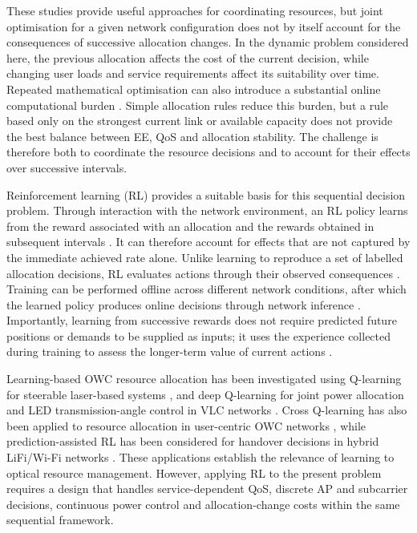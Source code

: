 \documentclass[journal]{IEEEtran}
\begin{document}
These studies provide useful approaches for coordinating resources, but joint optimisation for a given network configuration does not by itself account for the consequences of successive allocation changes. In the dynamic problem considered here, the previous allocation affects the cost of the current decision, while changing user loads and service requirements affect its suitability over time. Repeated mathematical optimisation can also introduce a substantial online computational burden \cite{Jiang2018,Ncube2025Predictive}. Simple allocation rules reduce this burden, but a rule based only on the strongest current link or available capacity does not provide the best balance between EE, QoS and allocation stability. The challenge is therefore both to coordinate the resource decisions and to account for their effects over successive intervals.

Reinforcement learning (RL) provides a suitable basis for this sequential decision problem. Through interaction with the network environment, an RL policy learns from the reward associated with an allocation and the rewards obtained in subsequent intervals \cite{Mnih2015DQN,Haarnoja2018SAC}. It can therefore account for effects that are not captured by the immediate achieved rate alone. Unlike learning to reproduce a set of labelled allocation decisions, RL evaluates actions through their observed consequences \cite{Mnih2015DQN}. Training can be performed offline across different network conditions, after which the learned policy produces online decisions through network inference \cite{AlHammadi2022DQL}. Importantly, learning from successive rewards does not require predicted future positions or demands to be supplied as inputs; it uses the experience collected during training to assess the longer-term value of current actions \cite{Mnih2015DQN}.

Learning-based OWC resource allocation has been investigated using Q-learning for steerable laser-based systems \cite{Elgamal2021Steerable}, and deep Q-learning for joint power allocation and LED transmission-angle control in VLC networks \cite{AlHammadi2022DQL}. Cross Q-learning has also been applied to resource allocation in user-centric OWC networks \cite{Feng2025CrossQ}, while prediction-assisted RL has been considered for handover decisions in hybrid LiFi/Wi-Fi networks \cite{Frometa2024Handover}. These applications establish the relevance of learning to optical resource management. However, applying RL to the present problem requires a design that handles service-dependent QoS, discrete AP and subcarrier decisions, continuous power control and allocation-change costs within the same sequential framework.
\end{document}
